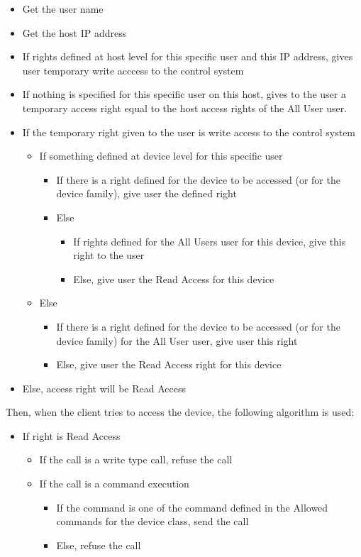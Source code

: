 \begin{itemize}
\item Get the user name
\item Get the host IP address
\item If rights defined at host level for this specific user and this IP
address, gives user temporary write acccess to the control system
\item If nothing is specified for this specific user on this host, gives
to the user a temporary access right equal to the host access rights
of the \textquotedbl{}All User\textquotedbl{} user.
\item If the temporary right given to the user is write access to the control
system

\begin{itemize}
\item If something defined at device level for this specific user

\begin{itemize}
\item If there is a right defined for the device to be accessed (or for
the device family), give user the defined right
\item Else

\begin{itemize}
\item If rights defined for the \textquotedbl{}All Users\textquotedbl{}
user for this device, give this right to the user
\item Else, give user the Read Access for this device
\end{itemize}
\end{itemize}
\item Else

\begin{itemize}
\item If there is a right defined for the device to be accessed (or for
the device family) for the \textquotedbl{}All User\textquotedbl{}
user, give user this right
\item Else, give user the Read Access right for this device
\end{itemize}
\end{itemize}
\item Else, access right will be Read Access
\end{itemize}
Then, when the client tries to access the device, the following algorithm
is used:
\begin{itemize}
\item If right is Read Access

\begin{itemize}
\item If the call is a write type call, refuse the call
\item If the call is a command execution

\begin{itemize}
\item If the command is one of the command defined in the \textquotedbl{}Allowed
commands\textquotedbl{} for the device class, send the call
\item Else, refuse the call
\end{itemize}
\end{itemize}
\end{itemize}
